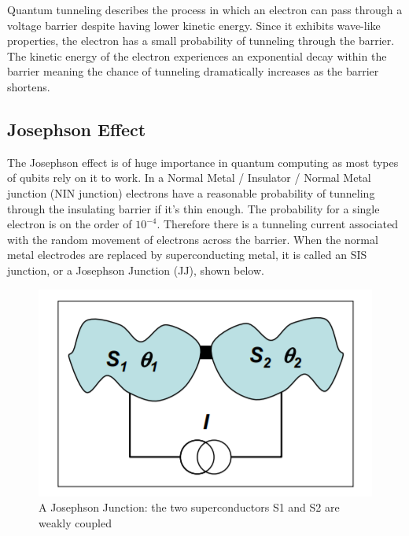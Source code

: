 \documentclass[conf]{new-aiaa}
\begin{document}
Quantum tunneling describes the process in which an electron can pass through a voltage barrier despite having lower kinetic energy. Since it exhibits wave-like properties, the electron has a small probability of tunneling through the barrier. The kinetic energy of the electron experiences an exponential decay within the barrier meaning the chance of tunneling dramatically increases as the barrier shortens. 


\subsection{Josephson Effect}
The Josephson effect is of huge importance in quantum computing as most types of qubits rely on it to work. In a Normal Metal / Insulator / Normal Metal junction (NIN junction) electrons have a reasonable probability of tunneling through the insulating barrier if it's thin enough. The probability for a single electron is on the order of $10^{-4}$. Therefore there is a tunneling current associated with the random movement of electrons across the barrier. When the normal metal electrodes are replaced by superconducting metal, it is called an SIS junction, or a Josephson Junction (JJ), shown below. \par 

\begin{figure}[!ht]
    \centering
    \includegraphics{junction.PNG}
    \caption{A Josephson Junction: the two superconductors S1 and S2 are weakly coupled}
    \label{fig:my_label}
\end{figure}
\end{document}
